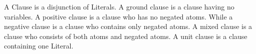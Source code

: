 A Clause is a disjunction of Literals. A ground clause is a clause having no variables. A positive clause is a clause who has no negated atoms. While a negative clause is a clause who contains only negated atoms. A mixed clause is a clause who consists of both atoms and negated atoms. A unit clause is a clause containing one Literal.

\begin{comment}
\chapter{Implementation Details}\label{chap:appendix_imp}

\section{Transformations}
Transformations pseudo-code


Add where equality is handled.


Another simplification were made to remove redundant clauses.


\section{Bachmair and Ganzinger Model Construction}
We made a great use of the shared terms implemented in E. Since each term is only represented once in a term bank. So we added an attribute for the term structure representing whether it is evaluated to true or false.


Comparison functions that takes the ordering into consideration were implemented. One is used for sorting the literals in a given clause. The other is for sorting the clauses in the clause set. A pseudo-code for sorting a clause can be found here \ref{alg:lit_comp_fun}. And --- is the pseudo-code for sorting a clause set.

\begin{algorithm}
	\caption{Literal Comparison Function}
	\label{alg:lit_comp_fun}
	\begin{algorithmic}[1]
	\Procedure{CH\textendash Election}{}
		\For{each node $i$ \Pisymbol{psy}{206} $N$ }
			\State Broadcast HELLO message to its neighbor
			\State let $k$ \Pisymbol{psy}{206} $N1$ ($i$) U {$i$} be s.t
			\State QOS($k$) = max {QOS($j$) \textbar $j$ \Pisymbol{psy}{206} $N1$($i$)  U $i$}
			\State MPRSet($i$) = $k$
		\EndFor
	\EndProcedure
	\end{algorithmic}
\end{algorithm}


Equality is handled in the following parts of the code -- .


Adding visual output.
\end{comment}

